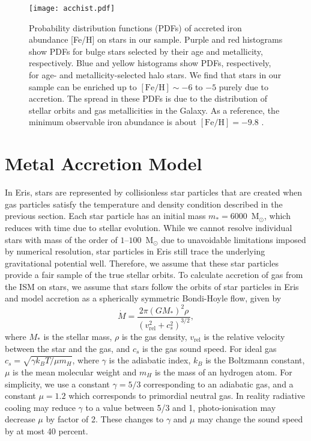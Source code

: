 \documentclass[a4paper,fleqn,usenatbib]{mnras}
\begin{document}
\begin{figure*}
  \begin{center}
    \texttt{[image: acchist.pdf]}
  \end{center}
  \caption{Probability distribution functions (PDFs) of accreted iron
    abundance [Fe/H] on stars in our sample.  Purple and red
    histograms show PDFs for bulge stars selected by their age and
    metallicity, respectively.  Blue and yellow histograms show PDFs,
    respectively, for age- and metallicity-selected halo stars.  We
    find that stars in our sample can be enriched up to
    $[\mathrm{Fe}/\mathrm{H}] \sim -6$ to $-5$ purely due to
    accretion.  The spread in these PDFs is due to the distribution of
    stellar orbits and gas metallicities in the Galaxy.  As a
    reference, the minimum observable iron abundance is about
    $[\mathrm{Fe}/\mathrm{H}]=-9.8$ \citep{2013pss5.book...55F}.}
  \label{fig:FeH_PDF}
\end{figure*}

\section{Metal Accretion Model}
\label{sec:acc}

In Eris, stars are represented by collisionless star particles that
are created when gas particles satisfy the temperature and density
condition described in the previous section.  Each star particle has
an initial mass $m_{\ast} = 6000$~M$_\odot$, which reduces with time
due to stellar evolution.  While we cannot resolve individual stars
with mass of the order of $1$--$100$~M$_\odot$ due to unavoidable
limitations imposed by numerical resolution, star particles in Eris
still trace the underlying gravitational potential well.  Therefore,
we assume that these star particles provide a fair sample of the true
stellar orbits.  To calculate accretion of gas from the ISM on stars,
we assume that stars follow the orbits of star particles in Eris and
model accretion as a spherically symmetric Bondi-Hoyle flow, given by
\citep{1939PCPS...35..405H, 1952MNRAS.112..195B, 1985MNRAS.217..367S}
\begin{equation}
  \dot{M} = \frac{2\pi(GM_\ast)^{2}\rho}{(v_\mathrm{rel}^{2} + c_{s}^{2})^{3/2}},
  \label{eqn:bh}
\end{equation}
where $M_{\ast}$ is the stellar mass, $\rho$ is the gas density,
$v_\mathrm{rel}$ is the relative velocity between the star and the
gas, and $c_{s}$ is the gas sound speed. For ideal gas
$c_{s}=\sqrt{\gamma k_{B} T/\mu m_{H}}$, where $\gamma$ is the
adiabatic index, $k_{B}$ is the Boltzmann constant, $\mu$ is the mean
molecular weight and $m_{H}$ is the mass of an hydrogen atom. For
simplicity, we use a constant $\gamma = 5/3$ corresponding to an
adiabatic gas, and a constant $\mu = 1.2$ which corresponds to
primordial neutral gas.  In reality radiative cooling may reduce
$\gamma$ to a value between 5/3 and 1, photo-ionisation may decrease
$\mu$ by factor of 2. These changes to $\gamma$ and $\mu$ may change
the sound speed by at most 40 percent.
\end{document}

